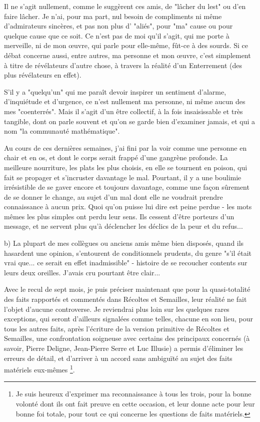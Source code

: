 Il ne s'agit nullement, comme le suggèrent ces amis, de "lâcher du lest" ou d'en faire lâcher. Je n'ai, pour ma part, nul besoin de compliments ni même d'admirateurs sincères, et pas non plus d' "aliés", pour "ma" cause ou pour quelque cause que ce soit. Ce n'est pas de moi qu'il s'agit, qui me porte à merveille, ni de mon œuvre, qui parle pour elle-même, fût-ce à des sourds. Si ce débat concerne aussi, entre autres, ma personne et mon œuvre, c'est simplement à titre de révélateurs d'autre chose, à travers la réalité d'un Enterrement (des plus révélateurs en effet).

S'il y a "quelqu'un" qui me paraît devoir inspirer un sentiment d'alarme, d'inquiétude et d'urgence, ce n'est nullement ma personne, ni même aucun des mes "coenterrés". Mais il s'agit d'un être collectif, à la fois insaisissable et très tangible, dont on parle souvent et qu'on se garde bien d'examiner jamais, et qui a nom "la communauté mathématique".

Au cours de ces dernières semaines, j'ai fini par la voir comme une personne en chair et en os, et dont le corps serait frappé d'une gangrène profonde. La meilleure nourriture, les plats les plus choisis, en elle se tournent en poison, qui fait se propager et s'incruster davantage le mal. Pourtant, il y a une boulimie irrésistible de se gaver encore et toujours davantage, comme une façon sûrement de se donner le change, au sujet d'un mal dont elle ne voudrait prendre connaissance à aucun prix. Quoi qu'on puisse lui dire est peine perdue - les mots mêmes les plus simples ont perdu leur sens. Ils cessent d'être porteurs d'un message, et ne servent plus qu'à déclencher les déclics de la peur et du refus...

b) La plupart de mes collègues ou anciens amis même bien disposés, quand ils hasardent une opinion, s'entourent de conditionnels prudents, du genre "s'il était vrai que... ce serait en effet inadmissible" - histoire de se recoucher contents sur leurs deux oreilles. J'avais cru pourtant être clair...

Avec le recul de sept mois, je puis préciser maintenant que pour la quasi-totalité des faits rapportés et commentés dans Récoltes et Semailles, leur réalité ne fait l'objet d'aucune controverse. Je reviendrai plus loin sur les quelques rares exceptions, qui seront d'ailleurs signalées comme telles, chacune en son lieu, pour tous les autres faits, après l'écriture de la version primitive de Récoltes et Semailles, une confrontation soigneuse avec certains des principaux concernés (à savoir, Pierre Deligne, Jean-Pierre Serre et Luc Illusie) a permis d'éliminer les erreurs de détail, et d'arriver à un accord sans ambiguïté au sujet des faits matériels eux-mêmes \footnote{Je suis heureux d'exprimer ma reconnaissance à tous les trois, pour la bonne volonté dont ils ont fait preuve en cette occasion, et leur donne acte pour leur bonne foi totale, pour tout ce qui concerne les questions de faits matériels.}.

